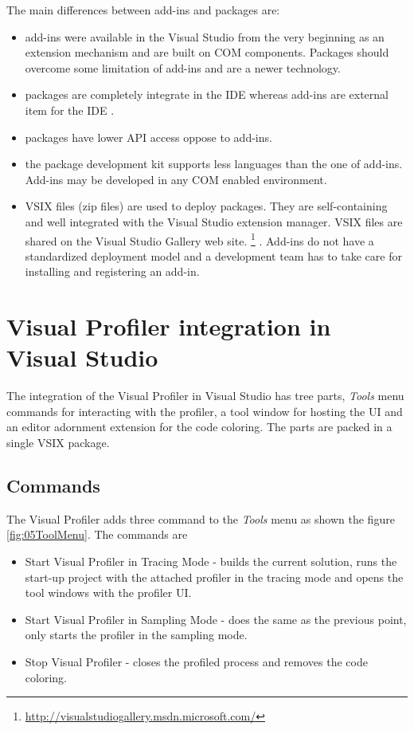The main differences between add-ins and packages are:
\begin{itemize}	
\item  add-ins were available in the Visual Studio from the very beginning as an extension mechanism and are built on COM components. Packages should overcome some limitation of add-ins and are a newer technology.

\item packages are completely integrate in the IDE whereas add-ins are external item for the IDE  .

\item packages have lower API access oppose to add-ins.

\item the package development kit supports less languages than the one of add-ins. Add-ins may be developed in any COM enabled environment.

\item VSIX files (zip files) are used to deploy packages. They are self-containing and well integrated with the Visual Studio extension manager. VSIX files are shared on the Visual Studio Gallery web site. \footnote{\href{http://visualstudiogallery.msdn.microsoft.com/}{http://visualstudiogallery.msdn.microsoft.com/}}
. Add-ins do not have a standardized deployment model and a development team has to take care for installing and registering an add-in.
\end{itemize}


\section{Visual Profiler integration in Visual Studio}
The integration of the Visual Profiler in Visual Studio has tree parts, \textit{Tools} menu commands for interacting with the profiler, a tool window for hosting the UI and an editor adornment extension for the code coloring. The parts are packed in a single VSIX package.

\subsection{Commands}
The Visual Profiler adds three command to the \textit{Tools} menu as shown the figure \ref{fig:05ToolMenu}. The commands are


\begin{itemize}
\item Start Visual Profiler in Tracing Mode - builds the current solution, runs the start-up project with the attached profiler in the tracing mode and opens the tool windows with the profiler UI.

\item Start Visual Profiler in Sampling Mode - does the same as the previous point, only  starts the profiler in the sampling mode.

\item Stop Visual Profiler - closes the profiled process and removes the code coloring.
\end{itemize}

